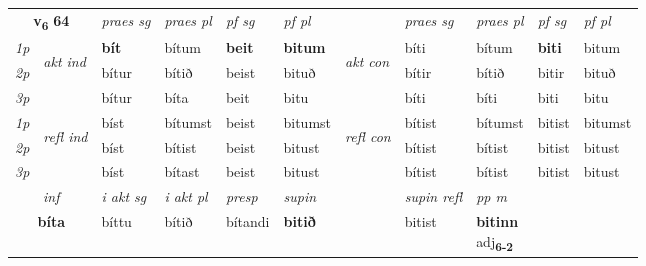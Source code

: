 \noindent
\begin{tabular}{lllllllllll} \toprule
\multicolumn{2}{c}{\textbf{v{\textsubscript{6}}} \Large{\textbf{64}}}  &  \textit{praes sg}  & \textit{praes pl}  &\textit{ pf sg} & \textit{pf pl} &  &  \textit{praes sg}  & \textit{praes pl}  & \textit{pf sg} & \textit{pf pl } \\*
	\cmidrule{3-6} \cmidrule{8-11}
 {\textit{1p}} & \multirow{3}{*}{\begin{turn}{90}\textit{akt ind}\end{turn}} & \textbf{bít} & bítum & \textbf{beit} & \textbf{bitum} & \multirow{3}{*}{\begin{turn}{90}\textit{akt con}\end{turn}} &bíti & bítum & \textbf{biti} & bitum\\*
 {\textit{2p}} &  &  bítur  & bítið & beist & bituð & & bítir & bítið & bitir & bituð \\*
{\textit{3p}} &  & bítur & bíta & beit & bitu & & bíti & bíti& biti & bitu \\*
\cmidrule{3-6} \cmidrule{8-11}
 {\textit{1p}} & \multirow{3}{*}{\begin{turn}{90}\textit{refl ind}\end{turn}}  & bíst & bítumst & beist & bitumst & \multirow{3}{*}{\begin{turn}{90}\textit{refl con}\end{turn}}  &bítist & bítumst & bitist & bitumst \\*
 {\textit{2p}} &  & bíst & bítist & beist & bitust & &bítist & bítist & bitist & bitust \\*
 {\textit{3p}}  & & bíst & bítast & beist & bitust & & bítist & bítist& bitist & bitust \\*
\cmidrule{3-6} \cmidrule{8-11}

   \multicolumn{2}{c}{\textit{inf}}  & \textit{i akt sg} & \textit{i akt pl}   & \textit{presp} & \textit{supin} && \textit{supin refl} & \textit{pp m} \\*
  \multicolumn{2}{c}{\textbf{bíta}} & bíttu  & bítið   & bítandi &  \textbf{bitið} && bitist & \specialcell{\textbf{bitinn} \\ adj\textbf{\textsubscript{6-2}}} \\*
\end{tabular}

